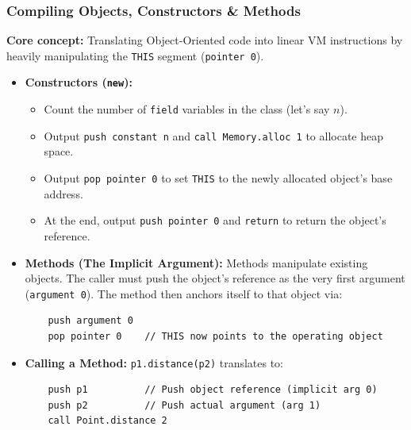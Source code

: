 \documentclass[12pt,a4paper]{article}
\begin{document}
\subsubsection*{Compiling Objects, Constructors \& Methods}
\textbf{Core concept:} Translating Object-Oriented code into linear VM instructions by heavily manipulating the \texttt{THIS} segment (\texttt{pointer 0}).
\begin{itemize}
    \item \textbf{Constructors (\texttt{new}):} 
    \begin{itemize}
        \item Count the number of \texttt{field} variables in the class (let's say $n$).
        \item Output \texttt{push constant n} and \texttt{call Memory.alloc 1} to allocate heap space.
        \item Output \texttt{pop pointer 0} to set \texttt{THIS} to the newly allocated object's base address.
        \item At the end, output \texttt{push pointer 0} and \texttt{return} to return the object's reference.
    \end{itemize}
    \item \textbf{Methods (The Implicit Argument):} Methods manipulate existing objects. The caller must push the object's reference as the very first argument (\texttt{argument 0}). The method then anchors itself to that object via:
    \begin{verbatim}
    push argument 0
    pop pointer 0    // THIS now points to the operating object
    \end{verbatim}
    \item \textbf{Calling a Method:} \texttt{p1.distance(p2)} translates to:
    \begin{verbatim}
    push p1          // Push object reference (implicit arg 0)
    push p2          // Push actual argument (arg 1)
    call Point.distance 2
    \end{verbatim}
\end{itemize}
\end{document}

